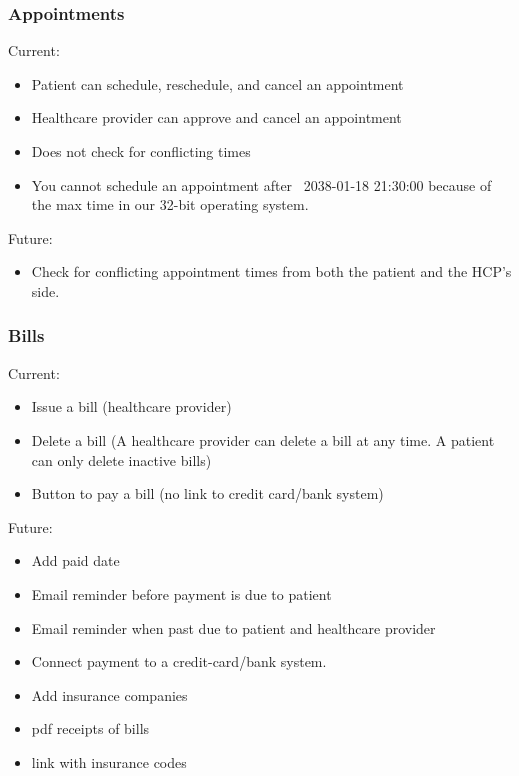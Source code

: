\subsubsection{Appointments}
Current: 
\begin{itemize}
\item Patient can schedule, reschedule, and cancel an appointment
\item Healthcare provider can approve and cancel an appointment
\item Does not check for conflicting times 
\item You cannot schedule an appointment after ~2038-01-18 21:30:00 because of the max time in our 32-bit operating system. 
\end{itemize}
Future: 
\begin{itemize}
\item Check for conflicting appointment times from both the patient and the HCP's side. 
\end{itemize}

\subsubsection{Bills}
Current:
\begin{itemize}
\item Issue a bill (healthcare provider)
\item Delete a bill (A healthcare provider can delete a bill at any time. A patient can only delete inactive bills)
\item Button to pay a bill (no link to credit card/bank system)
\end{itemize}
Future:
\begin{itemize}
\item Add paid date
\item Email reminder before payment is due to patient
\item Email reminder when past due to patient and healthcare provider
\item Connect payment to a credit-card/bank system.
\item Add insurance companies
\item pdf receipts of bills
\item link with insurance codes
\end{itemize}

